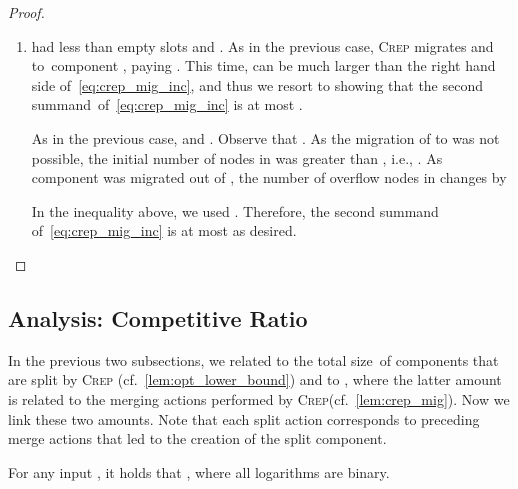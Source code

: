 \documentclass{siamart190516}
\newcommand{\CREP}{\textsc{Crep}\xspace}
\begin{document}
\begin{proof}
\begin{enumerate}
\item 
 had less than  empty slots and .
As in the previous case, \CREP migrates  and  to~component , 
paying .
This time,  can be much larger than the right hand side 
of~\eqref{eq:crep_mig_inc}, and thus we resort to showing that 
the second summand~of~\eqref{eq:crep_mig_inc} is at most .

As in the previous case,  and . 
Observe that .
As the migration of  to  was not possible, the initial number
of nodes in  was greater than ,
i.e., . 
As component  was migrated out of , the number of overflow nodes in  changes by

In the inequality above, we used .
Therefore, the second summand of~\eqref{eq:crep_mig_inc} is at most 
 as desired.
\end{enumerate}
\end{proof}



\subsection{Analysis: Competitive Ratio}
\label{sec:crep_ratio}

In the previous two subsections, we related  to the total
size~of components that are split by \CREP
(cf.~\cref{lem:opt_lower_bound}) and  to , where the latter amount is related to the merging
actions performed by \CREP (cf.~\cref{lem:crep_mig}). Now we link
these two amounts. Note that each split action corresponds to preceding
merge actions that led to the creation of the split component.

\begin{lemma}
\label{lem:bounding_merges}
For any input , it holds that 
,
where all logarithms are binary.
\end{lemma}
\end{document}
